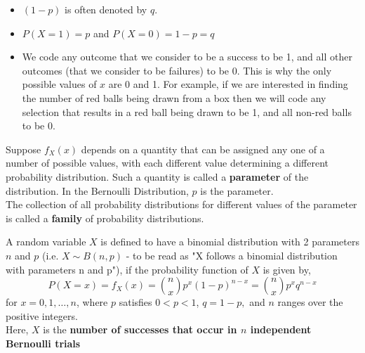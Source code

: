 \begin{note}
\end{note}
\begin{itemize}
    \item $(1-p)$ is often denoted by $q$.
    \item $P(X = 1) = p$ and $P(X = 0) = 1 - p = q$
    \item We code any outcome that we consider to be a success to be 1, and all other outcomes (that we consider to be failures) to be 0. This is why the only possible values of $x$ are 0 and 1. For example, if we are interested in finding the number of red balls being drawn from a box then we will code any selection that results in a red ball being drawn to be 1, and all non-red balls to be 0.
\end{itemize}

\begin{note}
\end{note}
Suppose $f_X(x)$ depends on a quantity that can be assigned any one of a number of possible values, with each different value determining a different probability distribution. Such a quantity is called a \textbf{parameter} of the distribution. In the Bernoulli Distribution, $p$ is the parameter. \\
The collection of all probability distributions for different values of the parameter is called a \textbf{family} of probability distributions.


\begin{definition}
A random variable $X$ is defined to have a binomial distribution with 2 parameters $n$ and $p$ (i.e. $X \sim B(n,p)$ - to be read as "X follows a binomial distribution with parameters n and p"), if the probability function of $X$ is given by, 
$$
P(X = x) = f_X(x) = 
\binom{n}{x}p^x (1-p)^{n-x} = \binom{n}{x} p^x q^{n-x}
$$
for $x = 0, 1, \dots , n$, where $p$ satisfies $ 0 < p < 1$,  $q = 1-p,$ and $n$ ranges over the positive integers. \\
Here, $X$ is the \textbf{number of successes that occur in $n$ independent Bernoulli trials}
\end{definition}

